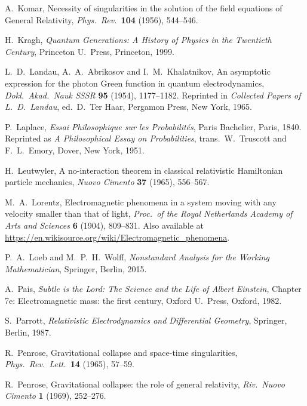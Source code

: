 \documentclass{article}
\begin{document}
\begin{thebibliography}{10}
 A.\ Komar, Necessity of singularities in the solution of the field equations of General Relativity, \textsl{Phys.\ Rev.\ }\textbf{104} (1956), 544--546.

 H.\ Kragh, \textsl{Quantum Generations: A History of Physics in the Twentieth Century}, Princeton U.\ Press, Princeton, 1999.
 
 L.\ D.\ Landau, A.\ A.\ Abrikosov and I.\ M.\ Khalatnikov, An asymptotic expression for the photon Green function in quantum electrodynamics, \textsl{Dokl.\ Akad.\ Nauk SSSR} \textbf{95} (1954), 1177--1182.  Reprinted in \textsl{Collected Papers of L.\ D.\ Landau}, ed.\ D.\ Ter Haar, Pergamon Press, New York, 1965.

 P.\ Laplace, \textsl{Essai Philosophique sur les Probabilit\'es},  Paris Bachelier, Paris, 1840.  Reprinted as \textsl{A Philosophical Essay on Probabilities}, trans.\ W.\ Truscott and F.\ L.\ Emory, Dover, New York, 1951.

  H.\ Leutwyler, A no-interaction theorem in classical relativistic Hamiltonian particle mechanics, \textsl{Nuovo Cimento} \textbf{37} (1965), 556--567.

 M.\ A.\ Lorentz, Electromagnetic phenomena in a system moving with any velocity smaller than that of light, \textsl{Proc.\ of the Royal Netherlands Academy of Arts and Sciences }{\bf 6} (1904), 809–831.  Also available at \href{https://en.wikisource.org/wiki/Electromagnetic_phenomena}{https://en.wikisource.org/wiki/Electromagnetic\_phenomena}.

  P.\ A.\ Loeb and M.\ P.\ H.\ Wolff, \textsl{Nonstandard Analysis for the Working Mathematician}, Springer, Berlin, 2015.

 A.\ Pais,  \textsl{Subtle is the Lord: The Science and the Life of Albert Einstein}, Chapter 7e: Electromagnetic mass: the first century, Oxford U.\ Press, Oxford, 1982.  

 S.\ Parrott, \textsl{Relativistic Electrodynamics and Differential Geometry}, Springer, Berlin, 1987.

 R.\ Penrose, Gravitational collapse and space-time singularities, \textsl{Phys.\ Rev.\ Lett.\ }\textbf{14} (1965), 57--59.

  R.\ Penrose, Gravitational collapse: the role of general relativity, \textsl{Riv.\ Nuovo Cimento} \textbf{1} (1969), 252--276.


\end{thebibliography}
\end{document}
